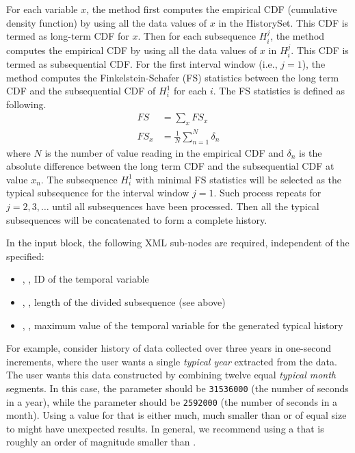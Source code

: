For each variable $x$, the method first computes the empirical CDF (cumulative density function) by using all the data values of $x$ in the HistorySet. This CDF is termed as long-term CDF for $x$. Then for each subsequence $H_i^j$, the method computes the empirical CDF by using all the data values of $x$ in $H_i^j$. This CDF is termed as subsequential CDF. For the first interval window (i.e., $j=1$), the method computes the Finkelstein-Schafer (FS) statistics \cite{finkelstein1971improved} between the long term CDF and the subsequential CDF of $H_i^1$ for each $i$. The FS statistics is defined as following.
\begin{align*}
FS & = \sum_x FS_x\\
FS_x &= \frac{1}{N}\sum_{n=1}^N\delta_n
\end{align*}
where $N$ is the number of value reading in the empirical CDF and $\delta_n$ is the absolute difference between the long term CDF and the subsequential CDF at value $x_n$. The subsequence $H_i^1$ with minimal FS statistics will be selected as the typical subsequence for the interval window $j=1$. Such process repeats for $j=2,3,\dots$ until all subsequences have been processed. Then all the typical subsequences will be concatenated to form a complete history.

In the  input block, the following XML sub-nodes are required,
independent of the  specified:

\begin{itemize}
   \item {}, , ID of the temporal variable
   \item {}, , length of the divided subsequence (see above)
   \item {}, , maximum value of the temporal variable for the generated typical history
\end{itemize}

For example, consider history of data collected over three years in one-second increments,
where the user wants a single \emph{typical year} extracted from the data.
The user wants this data constructed by combining twelve equal \emph{typical month}
segments.  In this case, the parameter  should be \texttt{31536000} (the number of seconds
in a year), while the parameter  should be \texttt{2592000} (the number of seconds in a
month).  Using a value for  that is either much, much smaller than  or
of equal size to  might have unexpected results.  In general, we recommend using a
 that is roughly an order of magnitude smaller than .

